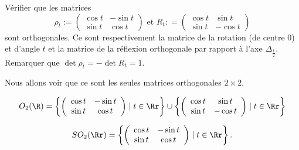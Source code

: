\documentclass[class=report,crop=false]{standalone}
\begin{document}
\begin{exercicecours}
Vérifier que les matrices \[\rho_t := \left( 
\begin{array}{cc}
\cos t & -\sin t \\ 
\sin t & \cos t
    \end{array}
 \right) \text{ et } R_t : = \left(
\begin{array}{cc}
\cos t & \sin t \\ 
\sin t & -\cos t
       \end{array}
 \right)\] sont orthogonales. Ce sont respectivement la matrice de la rotation (de centre $0$) et d'angle $t$ et la matrice de la réflexion orthogonale par rapport à l'axe $\Delta_{\frac{t}{2}}$. Remarquer que $\det \rho_t= -\det R_t= 1$.
\end{exercicecours}



Nous allons voir que ce sont les seules matrices orthogonales $2 \times 2$.



\begin{proposition}
 \[O_2(\R) =\left\lbrace {\left( 
\begin{array}{cc}
\cos t & -\sin t \\ 
\sin t & \cos t
                         \end{array}
                         \right) \mid t \in \Rr} \right\rbrace  \cup \left\lbrace {\left( 
\begin{array}{cc}
\cos t & \sin t \\ 
\sin t & -\cos t
                         \end{array}
                         \right) \mid t \in \Rr  }
\right\rbrace \]

\[SO_2(\Rr) = \left\lbrace {\left(
\begin{array}{cc}
\cos t & -\sin t \\ 
\sin t & \cos t
                         \end{array}
                         \right) \mid t \in \Rr} \right\rbrace  .\]
\end{proposition}
\end{document}
